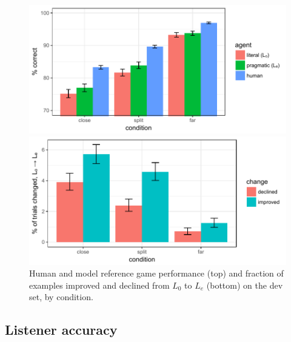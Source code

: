 \documentclass[11pt,letterpaper]{article}
\newcommand{\Listener}{L}
\renewcommand{\|}{\mid}
\begin{document}
\begin{figure}
\centering
\includegraphics[scale = .5]{figures/listenerAccuracy}

\includegraphics[scale = .5]{figures/changedByCondition.pdf}
\caption{Human and model reference game performance (top) and fraction of examples improved and
declined from $\Listener_0$ to $\Listener_e$ (bottom) on the dev set, by condition.}
\label{fig:listenerAccuracy}
\end{figure}

\subsection{Listener accuracy}

\newcommand{\intended}{\framebox}
\newcommand{\speakerpct}{\textit}
\end{document}
